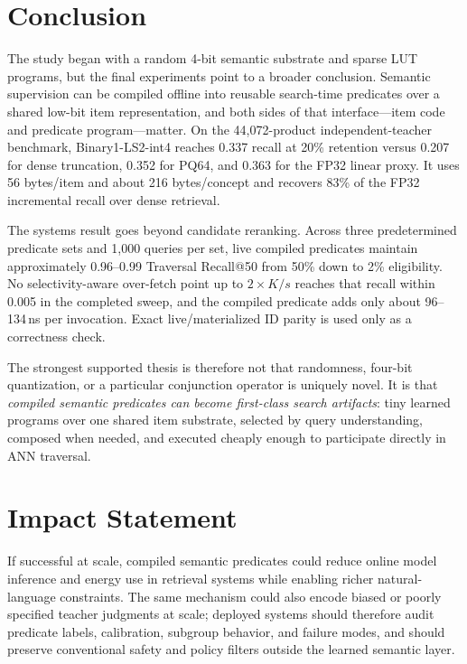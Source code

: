 \section{Conclusion}
The study began with a random 4-bit semantic substrate and sparse LUT programs, but the final experiments point to a broader conclusion. Semantic supervision can be compiled offline into reusable search-time predicates over a shared low-bit item representation, and both sides of that interface---item code and predicate program---matter. On the 44,072-product independent-teacher benchmark, Binary1-LS2-int4 reaches 0.337 recall at 20\% retention versus 0.207 for dense truncation, 0.352 for PQ64, and 0.363 for the FP32 linear proxy. It uses 56 bytes/item and about 216 bytes/concept and recovers 83\% of the FP32 incremental recall over dense retrieval.

The systems result goes beyond candidate reranking. Across three predetermined predicate sets and 1,000 queries per set, live compiled predicates maintain approximately 0.96--0.99 Traversal Recall@50 from 50\% down to 2\% eligibility. No selectivity-aware over-fetch point up to $2\times K/s$ reaches that recall within 0.005 in the completed sweep, and the compiled predicate adds only about 96--134\,ns per invocation. Exact live/materialized ID parity is used only as a correctness check.

The strongest supported thesis is therefore not that randomness, four-bit quantization, or a particular conjunction operator is uniquely novel. It is that \emph{compiled semantic predicates can become first-class search artifacts}: tiny learned programs over one shared item substrate, selected by query understanding, composed when needed, and executed cheaply enough to participate directly in ANN traversal.

\section*{Impact Statement}
If successful at scale, compiled semantic predicates could reduce online model inference and energy use in retrieval systems while enabling richer natural-language constraints. The same mechanism could also encode biased or poorly specified teacher judgments at scale; deployed systems should therefore audit predicate labels, calibration, subgroup behavior, and failure modes, and should preserve conventional safety and policy filters outside the learned semantic layer.
